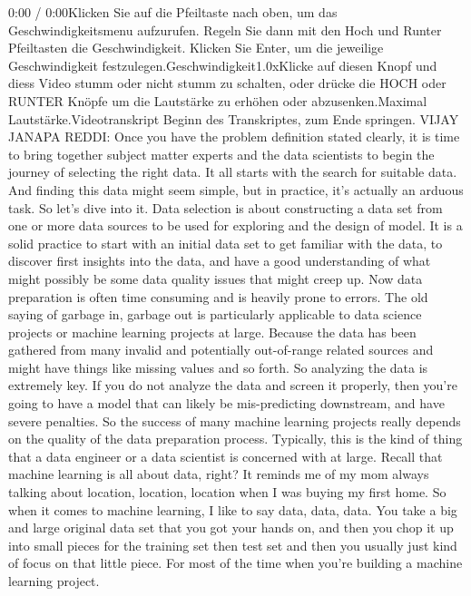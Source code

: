    0:00 / 0:00Klicken Sie auf die Pfeiltaste nach oben, um das Geschwindigkeitsmenu aufzurufen. Regeln Sie dann mit den Hoch und Runter Pfeiltasten die Geschwindigkeit. Klicken Sie Enter, um die jeweilige Geschwindigkeit festzulegen.Geschwindigkeit1.0xKlicke auf diesen Knopf und diess Video stumm oder nicht stumm zu schalten, oder drücke die HOCH oder RUNTER Knöpfe um die Lautstärke zu erhöhen oder abzusenken.Maximal Lautstärke.Videotranskript
    Beginn des Transkriptes, zum Ende springen.
    VIJAY JANAPA REDDI: Once you have the problem definition stated clearly,
    it is time to bring together subject matter experts and the data scientists
    to begin the journey of selecting the right data.
    It all starts with the search for suitable data.
    And finding this data might seem simple, but in practice, it's
    actually an arduous task.
    So let's dive into it.
    Data selection is about constructing a data set from one or more data sources
    to be used for exploring and the design of model.
    It is a solid practice to start with an initial data set
    to get familiar with the data, to discover first insights into the data,
    and have a good understanding of what might possibly be some data quality
    issues that might creep up.
    Now data preparation is often time consuming
    and is heavily prone to errors.
    The old saying of garbage in, garbage out
    is particularly applicable to data science projects or machine
    learning projects at large.
    Because the data has been gathered from many invalid and potentially
    out-of-range related sources and might have things like missing values
    and so forth.
    So analyzing the data is extremely key.
    If you do not analyze the data and screen it properly,
    then you're going to have a model that can likely
    be mis-predicting downstream, and have severe penalties.
    So the success of many machine learning projects really
    depends on the quality of the data preparation process.
    Typically, this is the kind of thing that a data engineer or a data
    scientist is concerned with at large.
    Recall that machine learning is all about data, right?
    It reminds me of my mom always talking about location, location, location
    when I was buying my first home.
    So when it comes to machine learning, I like to say data, data, data.
    You take a big and large original data set that you got your hands on,
    and then you chop it up into small pieces for the training
    set then test set and then you usually just kind of focus
    on that little piece.
    For most of the time when you're building a machine learning project.
